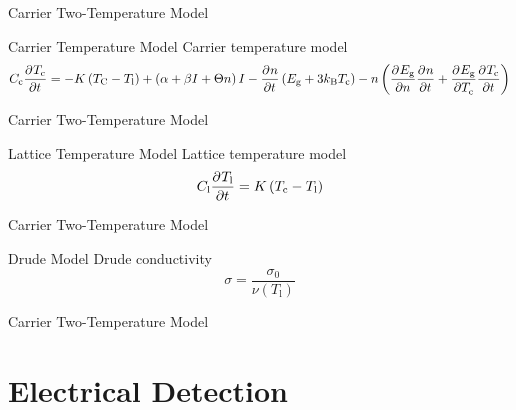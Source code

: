 \documentclass[aspectratio=169, 10pt]{beamer}
\begin{document}
\begin{frame}{Carrier Two-Temperature Model}
  \begin{block}{Carrier Temperature Model}
        Carrier temperature model
    \begin{equation}
      C_{\text{c}}\pdv[]{T_{\text{c}}}{t}=-K\left(T_{\text{C}}-T_{\text{l}}\right)+\left(\alpha +\beta I +\Theta n\right)I -\pdv[]{n}{t}\left(E_{\text{g}}+3k_{\text{B}}T_{\text{c}}\right)-n\left(\pdv[]{E_{\text{g}}}{n}\pdv[]{n}{t}+\pdv[]{E_{\text{g}}}{T_{\text{c}}}\pdv[]{T_{\text{c}}}{t}\right)
     \end{equation}
  \end{block}
  \centering
  \resizebox{\textwidth}{!}{}
\end{frame}


\begin{frame}{Carrier Two-Temperature Model}
  \begin{block}{Lattice Temperature Model}
        Lattice temperature model
    \begin{equation}
      C_{\text{l}}\pdv[]{T_{\text{l}}}{t}=K\left(T_{\text{c}}-T_{\text{l}}\right)
    \end{equation}
  \end{block}
  \centering
  \resizebox{0.5\textwidth}{!}{}
\end{frame}


\begin{frame}{Carrier Two-Temperature Model}
  \begin{block}{Drude Model}
        Drude conductivity
    \begin{equation}
      \sigma=\frac{\sigma_0}{\nu\left(T_{\text{l}}\right)}
    \end{equation}
  \end{block}

\end{frame}


\begin{frame}{Carrier Two-Temperature Model}
  \begin{figure}[!h]
    \centering
    \resizebox{0.8\textwidth}{!}{}
  \end{figure}
\end{frame}


\section{Electrical Detection}
\end{document}
